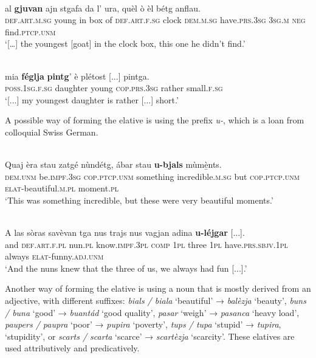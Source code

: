 \ea
{}\\
\gll    […] al \textbf{gjuvan} ajn stgafa da l' ura, quèl ò èl bétg anflau.\\
  {} \textsc{def.art.m.sg} young in box of \textsc{def.art.f.sg} clock \textsc{dem.m.sg} have.\textsc{prs.3sg} \textsc{3sg.m} \textsc{neg} find.\textsc{ptcp.unm}\\
\glt `[…] the youngest [goat] in the clock box, this one he didn’t find.'
\z

\ea
{}\\
	\gll  [...] mia \textbf{féglja} \textbf{pintg}’ è plétost [...] pintga.   \\
{} \textsc{poss.1sg.f.sg} daughter young \textsc{cop.prs.3sg} rather {} small.\textsc{f.sg}\\
\glt `[...] my youngest daughter is rather [...] short.'
\z

A possible way of forming the elative is using the prefix \textit{u-}, which is a loan from colloquial Swiss German.

\ea
{}\\
\gll  Quaj èra stau zatgé nùndétg, ábar stau \textbf{u-bjals} mùmè̱nts.\\
\textsc{dem.unm} be.\textsc{impf.3sg} \textsc{cop.ptcp.unm} something incredible.\textsc{m.sg} but \textsc{cop.ptcp.unm}  \textsc{elat}-beautiful.\textsc{m.pl} moment.\textsc{pl} \\
\glt `This was something incredible, but these were very beautiful moments.'
\z

\ea
{}\\
\gll    A las sòras savèvan tga nus trajs nus vagjan adina \textbf{u-léjgar} [...].\\
and \textsc{def.art.f.pl} nun.\textsc{pl} know.\textsc{impf.3pl} \textsc{comp} \textsc{1pl} three \textsc{1pl} have.\textsc{prs.sbjv.1pl} always \textsc{elat}-funny.\textsc{adj.unm}\\
\glt `And the nuns knew that the three of us, we always had fun [...].'
\z

Another way of forming the elative is using a noun that is mostly derived from an adjective, with different suffixes: \textit{bials / biala} `beautiful' → \textit{balèzja} `beauty', \textit{buns / buna} `good' → \textit{buantád} `good quality', \textit{pasar} `weigh' → \textit{pasanca} `heavy load', \textit{paupers / paupra} `poor' → \textit{pupira} `poverty', \textit{tups / tupa} `stupid' → \textit{tupira}, `stupidity', or \textit{scarts / scarta} `scarce' → \textit{scartèzja} `scarcity'. These elatives are used attributively and predicatively.

